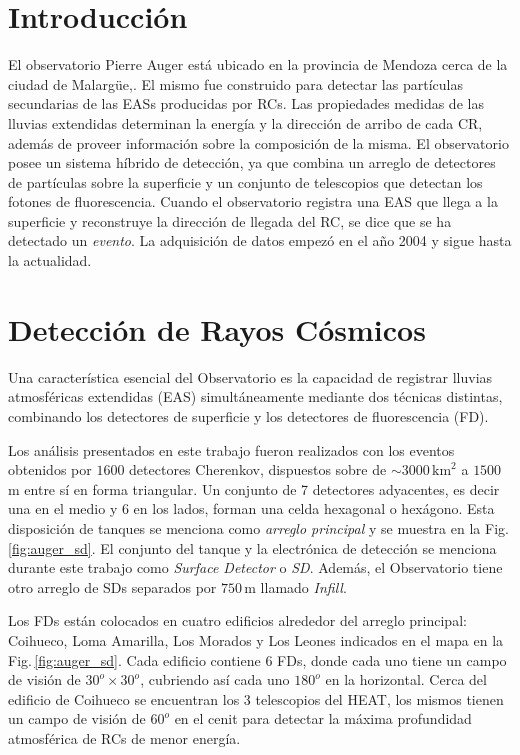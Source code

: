 

\section{Introducción}

{El observatorio Pierre Auger está ubicado en la provincia de Mendoza cerca de la ciudad de Malargüe,. El mismo fue construido para detectar las partículas secundarias de las EASs producidas por RCs.  Las propiedades medidas de las lluvias extendidas determinan la energía y la dirección de arribo de cada CR, además de proveer información sobre  la composición de la  misma. El observatorio posee un sistema híbrido de detección, ya que combina un arreglo de detectores de partículas sobre la superficie y un conjunto de telescopios que detectan los fotones de fluorescencia. Cuando el observatorio  registra una EAS que llega a la superficie y reconstruye la dirección de llegada del RC, se dice que se ha detectado un \textit{evento}. La adquisición de datos empezó en el año 2004 y sigue hasta la actualidad.}


\section{Detección de Rayos Cósmicos}
Una característica esencial del Observatorio es la capacidad de registrar lluvias atmosféricas extendidas (EAS) simultáneamente mediante dos técnicas distintas, combinando los detectores de superficie y los detectores de fluorescencia (FD). 


Los análisis presentados en este trabajo fueron realizados con los eventos obtenidos por $ 1600$ detectores Cherenkov, dispuestos sobre de $\sim 3000\,\text{km}^2$ a $1500\,$m entre sí en forma triangular. Un conjunto de 7 detectores adyacentes, es decir una en el medio y 6 en los lados, forman una celda hexagonal o hexágono. Esta disposición de tanques se menciona como \textit{arreglo principal} y se muestra en la Fig.\,\ref{fig:auger_sd}. El conjunto del tanque y la electrónica de detección  se menciona durante este trabajo como \textit{Surface Detector} o \textit{SD}. Además, el Observatorio tiene otro arreglo de SDs separados por $750\,$m llamado \emph{Infill}.

Los FDs están colocados en cuatro edificios alrededor del arreglo principal: Coihueco, Loma Amarilla, Los Morados y Los Leones indicados en el mapa en la Fig.\,\ref{fig:auger_sd}. Cada edificio contiene 6 FDs, donde cada uno tiene un campo de visión de $30^o\times30^o$, cubriendo así cada uno $180^o$ en la horizontal. Cerca del edificio de Coihueco se encuentran los 3 telescopios del HEAT, los mismos tienen un campo de visión de $60^o$ en el cenit para detectar la máxima profundidad atmosférica de RCs de menor energía.

